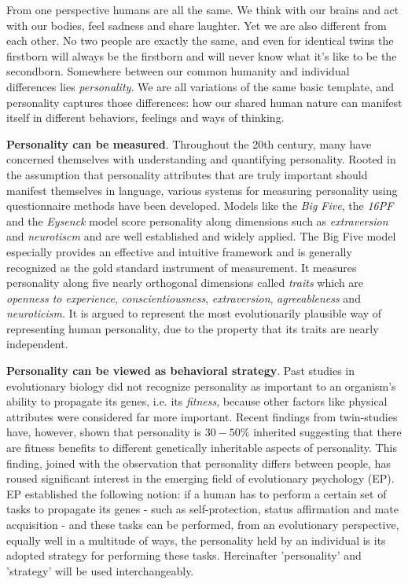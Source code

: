 From one perspective humans are all the same.
We think with our brains and act with our bodies, feel sadness and share laughter.
Yet we are also different from each other.
No two people are exactly the same, and even for identical twins the firstborn will always be the firstborn and will never know what it's like to be the secondborn.
Somewhere between our common humanity and individual differences lies \textit{personality}.
We are all variations of the same basic template, and personality captures those differences: how our shared human nature can manifest itself in different behaviors, feelings and ways of thinking.

\textbf{Personality can be measured}.
Throughout the 20th century, many have concerned themselves with understanding and quantifying personality.
Rooted in the assumption that personality attributes that are truly important should manifest themselves in language, various systems for measuring personality using questionnaire methods have been developed.
Models like the \textit{Big Five}, the \textit{16PF} and the \textit{Eysenck} model score personality along dimensions such as \textit{extraversion} and \textit{neurotiscm} and are well established and widely applied.
The Big Five model especially provides an effective and intuitive framework and is generally recognized as the gold standard instrument of measurement.
It measures personality along five nearly orthogonal dimensions called \textit{traits} which are \textit{openness to experience}, \textit{conscientiousness}, \textit{extraversion}, \textit{agreeableness} and \textit{neuroticism}.
It is argued to represent the most evolutionarily plausible way of representing human personality, due to the property that its traits are nearly independent.

\textbf{Personality can be viewed as behavioral strategy}.
Past studies in evolutionary biology did not recognize personality as important to an organism's ability to propagate its genes, i.e. its \textit{fitness}, because other factors like physical attributes were considered far more important.
Recent findings from twin-studies have, however, shown that personality is $30-50\%$ inherited suggesting that there are fitness benefits to different genetically inheritable aspects of personality.
This finding, joined with the observation that personality differs between people, has roused significant interest in the emerging field of evolutionary psychology (EP).
EP established the following notion: if a human has to perform a certain set of tasks to propagate its genes - such as self-protection, status affirmation and mate acquisition - and these tasks can be performed, from an evolutionary perspective, equally well in a multitude of ways, the personality held by an individual is its adopted strategy for performing these tasks.
Hereinafter 'personality' and 'strategy' will be used interchangeably.

